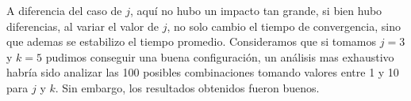 A diferencia del caso de $j$, aquí no hubo un impacto tan grande, si bien hubo diferencias, al variar el valor de $j$, no solo cambio el tiempo de convergencia, sino que ademas se estabilizo el tiempo promedio. Consideramos que si tomamos $j = 3$ y $k = 5$ pudimos conseguir una buena configuración, un análisis mas exhaustivo habría sido analizar las 100 posibles combinaciones tomando valores entre 1 y 10 para $j$ y $k$. Sin embargo, los resultados obtenidos fueron buenos.